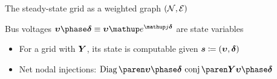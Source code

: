\begin{frame}[t]{The steady-state grid as a weighted graph \(\left(\mathcal{N},\mathcal{E}\right)\)}{}
{    \vspace{1em}
    Bus voltages \textcolor<5>{CornellRed}{\(\BusVs\equiv\BusVs[euler]\)}
    are \textcolor<5>{CornellRed}{state variables}
    \begin{itemize}
        \item For a grid with \(\boldsymbol{Y}\), its state is computable given
            \(\boldsymbol{s} \coloneqq \left(\boldsymbol{\upsilon},\boldsymbol{\delta}\right)\)
        \item[\ding{43}] Net nodal injections:
            \textcolor<5>{CornellRed}{\(\Diag{\BusVs} \, \Conj{\Ybus\BusVs}\)}
    \end{itemize}
    }
\end{frame}
